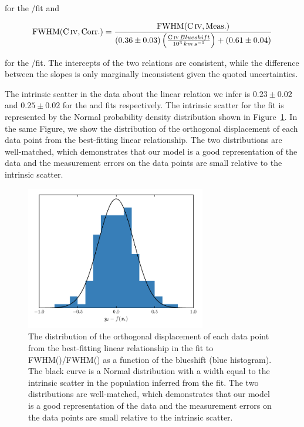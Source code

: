 \noindent for the /\ha fit and 

\begin{eqnarray}
    \label{eq:hbfwhm}
    \mathrm{FWHM}(\mathrm{C}\,\textsc{iv}, \mathrm{Corr.}) = \frac{\mathrm{FWHM}(\mathrm{C}\,\textsc{iv}, \mathrm{Meas.})}{ (0.36\pm0.03) \left(\frac{\mathrm{C}\,\textsc{iv}\, Blueshift}{10^3 {\mathrm \,km\,s^{-1}}} \right) + (0.61\pm0.04)}
\end{eqnarray}

\noindent for the /\hb fit. 
The intercepts of the two relations are consistent, while the difference between the slopes is only marginally inconsistent given the quoted uncertainties. 

The intrinsic scatter in the data about the linear relation we infer is $0.23 \pm 0.02$ and $0.25 \pm 0.02$ for the \ha and \hb fits respectively. 
The intrinsic scatter for the \ha fit is represented by the Normal probability density distribution shown in Figure~\ref{fig:intrinsic_scatter}. 
In the same Figure, we show the distribution of the orthogonal displacement of each data point from the best-fitting linear relationship. 
The two distributions are well-matched, which demonstrates that our model is a good representation of the data and the measurement errors on the data points are small relative to the intrinsic scatter.    

\begin{figure}
    \centering 
    \includegraphics[width=0.7\textwidth]{figures/chapter03/intrinsic_scatter.pdf} 
    \caption[{The distribution of the orthogonal displacement of each data point from the best-fitting linear relationship in the fit to FWHM()/FWHM(\hans) as a function of the  blueshift.}]{The distribution of the orthogonal displacement of each data point from the best-fitting linear relationship in the fit to FWHM()/FWHM(\hans) as a function of the  blueshift (blue histogram). The black curve is a Normal distribution with a width equal to the intrinsic scatter in the population inferred from the fit. The two distributions are well-matched, which demonstrates that our model is a good representation of the data and the measurement errors on the data points are small relative to the intrinsic scatter.} 
    \label{fig:intrinsic_scatter}
\end{figure}

